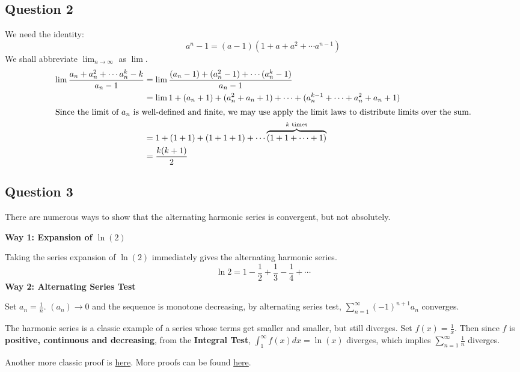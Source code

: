 \documentclass{article}
\begin{document}
\subsection*{Question 2}
We need the identity:
\begin{equation*}
    a^n - 1 = (a-1)(1+a+a^2+ \cdots a^{n-1})
\end{equation*}
We shall abbreviate $\lim_{n \to \infty}$ as $\lim$.
\begin{align*}
    \lim \frac{a_n + a_n^2 + \cdots a_n^k - k}{a_n-1} &= \lim \frac{(a_n-1) + (a_n^2-1) + \cdots (a_n^k-1)}{a_n-1} \\
    &= \lim 1+(a_n+1)+(a_n^2+a_n+1)+ \cdots + (a_n^{k-1} + \cdots +a_n^2+a_n+1) \\
\intertext{Since the limit of $a_n$ is well-defined and finite, we may use apply the limit laws to distribute limits over the sum.}
    &= 1+(1+1)+(1+1+1) + \cdots \overbrace{(1+1+ \cdots + 1)}^{k \text{ times}} \\
    &= \frac{k(k+1)}{2}
\end{align*}

\subsection*{Question 3}
There are numerous ways to show that the alternating harmonic series is convergent, but not absolutely. 

\textbf{Way 1: Expansion of $\ln(2)$}

Taking the series expansion of $\ln(2)$ immediately gives the alternating harmonic series.
\begin{equation*}
    \ln 2 = 1-\frac{1}{2}+\frac{1}{3}-\frac{1}{4}+\cdots 
\end{equation*}
\textbf{Way 2: Alternating Series Test}

Set $a_n=\frac{1}{n}$. $(a_n) \to 0$ and the sequence is monotone decreasing, by alternating series test, $\sum_{n=1}^{\infty} (-1)^{n+1} a_n$ converges.

The harmonic series is a classic example of a series whose terms get smaller and smaller, but still diverges. Set $f(x)=\frac{1}{x}$. Then since $f$ is \textbf{positive, continuous and decreasing}, from the \textbf{Integral Test}, $\int^{\infty}_1 f(x) dx = \ln(x)$ diverges, which implies $\sum_{n=1}^{\infty} \frac{1}{n}$ diverges.

Another more classic proof is \href{https://web.williams.edu/Mathematics/lg5/harmonic.pdf}{here}. More proofs can be found \href{https://www.elcamino.edu/faculty/gfry/191/HarmonicProofs2.pdf}{here}.
 
\end{document}
